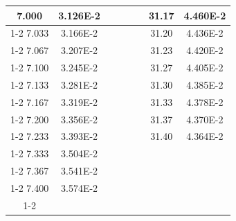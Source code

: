 \documentclass[article,12pt]{elsarticle}
\begin{document}
\begin{longtable}[c]{|c|c|cccccc}
7.000    & 3.126E-2  &                       &                              &                            & \multicolumn{1}{c|}{} & \multicolumn{1}{c|}{31.17}   & \multicolumn{1}{c|}{4.460E-2} \\ \cline{1-2} \cline{7-8} 
7.033    & 3.166E-2  &                       &                              &                            & \multicolumn{1}{c|}{} & \multicolumn{1}{c|}{31.20}   & \multicolumn{1}{c|}{4.436E-2} \\ \cline{1-2} \cline{7-8} 
7.067    & 3.207E-2  &                       &                              &                            & \multicolumn{1}{c|}{} & \multicolumn{1}{c|}{31.23}   & \multicolumn{1}{c|}{4.420E-2} \\ \cline{1-2} \cline{7-8} 
7.100    & 3.245E-2  &                       &                              &                            & \multicolumn{1}{c|}{} & \multicolumn{1}{c|}{31.27}   & \multicolumn{1}{c|}{4.405E-2} \\ \cline{1-2} \cline{7-8} 
7.133    & 3.281E-2  &                       &                              &                            & \multicolumn{1}{c|}{} & \multicolumn{1}{c|}{31.30}   & \multicolumn{1}{c|}{4.385E-2} \\ \cline{1-2} \cline{7-8} 
7.167    & 3.319E-2  &                       &                              &                            & \multicolumn{1}{c|}{} & \multicolumn{1}{c|}{31.33}   & \multicolumn{1}{c|}{4.378E-2} \\ \cline{1-2} \cline{7-8} 
7.200    & 3.356E-2  &                       &                              &                            & \multicolumn{1}{c|}{} & \multicolumn{1}{c|}{31.37}   & \multicolumn{1}{c|}{4.370E-2} \\ \cline{1-2} \cline{7-8} 
7.233    & 3.393E-2  &                       &                              &                            & \multicolumn{1}{c|}{} & \multicolumn{1}{c|}{31.40}   & \multicolumn{1}{c|}{4.364E-2} \\ \cline{1-2} \cline{7-8} 
7.333    & 3.504E-2  &                       &                              &                            &                       &                              &                               \\ \cline{1-2}
7.367    & 3.541E-2  &                       &                              &                            &                       &                              &                               \\ \cline{1-2}
7.400    & 3.574E-2  &                       &                              &                            &                       &                              &                               \\ \cline{1-2}

\end{longtable}
\end{document}
